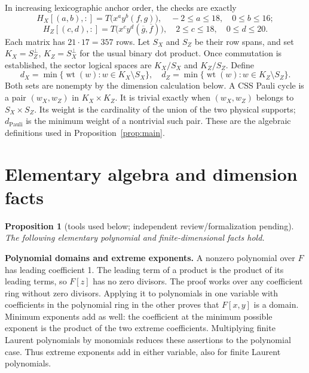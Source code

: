\documentclass{article}
\newtheorem{proposition}{Proposition}
\DeclareMathOperator{\wt}{wt}
\begin{document}
In increasing lexicographic anchor order, the checks are exactly
\begin{equation}
  H_X[(a,b), {:}] = T\bigl(x^a y^b (f, g)\bigr),
  \quad -2 \le a \le 18, \quad 0 \le b \le 16;
\end{equation}
\begin{equation}
  H_Z[(c,d), {:}] = T\bigl(x^c y^d (\overline{g}, \overline{f})\bigr),
  \quad 2 \le c \le 18, \quad 0 \le d \le 20.
\end{equation}
Each matrix has \(21 \cdot 17 = 357\) rows. Let \(S_X\) and \(S_Z\) be their row spans, and
set \(K_X = S_Z^{\perp}\), \(K_Z = S_X^{\perp}\) for the usual binary dot product. Once
commutation is established, the sector logical spaces are \(K_X/S_X\) and \(K_Z/S_Z\).
Define
\begin{equation}
  d_X = \min\{\wt(w) : w \in K_X \setminus S_X\}, \quad
  d_Z = \min\{\wt(w) : w \in K_Z \setminus S_Z\}.
\end{equation}
Both sets are nonempty by the dimension calculation below. A CSS Pauli cycle is a pair
\((w_X, w_Z)\) in \(K_X \times K_Z\). It is trivial exactly when \((w_X, w_Z)\) belongs to
\(S_X \times S_Z\). Its weight is the cardinality of the union of the two physical supports;
\(d_{\text{Pauli}}\) is the minimum weight of a nontrivial such pair. These are the algebraic
definitions used in Proposition~\ref{prop:main}.

\section{Elementary algebra and dimension facts}\label{sec:tools}

\begin{proposition}[tools used below; independent review\slash formalization pending]%
  \label{prop:tools}
  The following elementary polynomial and finite-dimensional facts hold.
\end{proposition}

\textbf{Polynomial domains and extreme exponents.} A nonzero polynomial over \(F\) has
leading coefficient 1. The leading term of a product is the product of its leading terms,
so \(F[z]\) has no zero divisors. The proof works over any coefficient ring without zero
divisors. Applying it to polynomials in one variable with coefficients in the polynomial ring
in the other proves that \(F[x,y]\) is a domain. Minimum exponents add as well: the
coefficient at the minimum possible exponent is the product of the two extreme coefficients.
Multiplying finite Laurent polynomials by monomials reduces these assertions to the
polynomial case. Thus extreme exponents add in either variable, also for finite Laurent polynomials.
\end{document}

